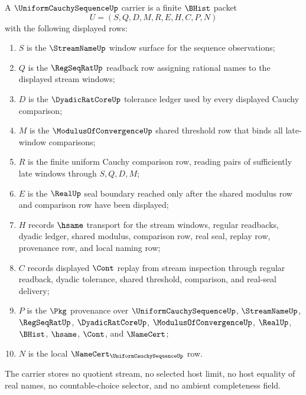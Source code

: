 \begin{definition}
\label{def:uniform-cauchy-sequence-carrier}
A $\UniformCauchySequenceUp$ carrier is a finite $\BHist$ packet
$$
U=(S,Q,D,M,R,E,H,C,P,N)
$$
with the following displayed rows:
\begin{enumerate}
\item $S$ is the $\StreamNameUp$ window surface for the sequence observations;
\item $Q$ is the $\RegSeqRatUp$ readback row assigning rational names to the displayed stream windows;
\item $D$ is the $\DyadicRatCoreUp$ tolerance ledger used by every displayed Cauchy comparison;
\item $M$ is the $\ModulusOfConvergenceUp$ shared threshold row that binds all late-window comparisons;
\item $R$ is the finite uniform Cauchy comparison row, reading pairs of sufficiently late windows through $S,Q,D,M$;
\item $E$ is the $\RealUp$ seal boundary reached only after the shared modulus row and comparison row have been displayed;
\item $H$ records $\hsame$ transport for the stream windows, regular readbacks, dyadic ledger, shared modulus, comparison row, real seal, replay row, provenance row, and local naming row;
\item $C$ records displayed $\Cont$ replay from stream inspection through regular readback, dyadic tolerance, shared threshold, comparison, and real-seal delivery;
\item $P$ is the $\Pkg$ provenance over $\UniformCauchySequenceUp$, $\StreamNameUp$, $\RegSeqRatUp$, $\DyadicRatCoreUp$, $\ModulusOfConvergenceUp$, $\RealUp$, $\BHist$, $\hsame$, $\Cont$, and $\NameCert$;
\item $N$ is the local $\NameCert_{\UniformCauchySequenceUp}$ row.
\end{enumerate}
The carrier stores no quotient stream, no selected host limit, no host equality of real names, no countable-choice selector, and no ambient completeness field.
\end{definition}

